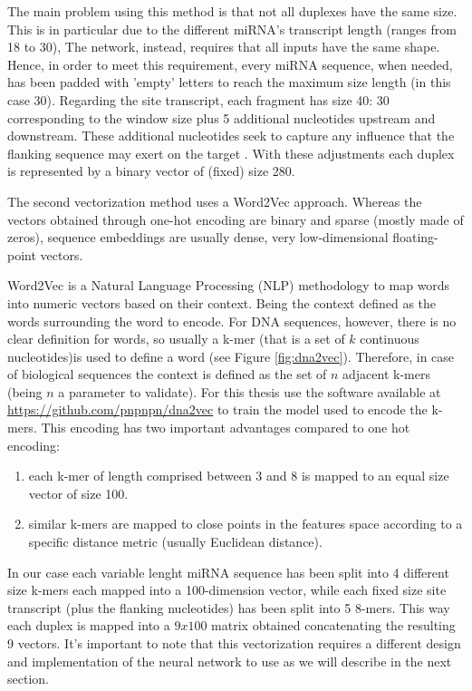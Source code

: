 The main problem using this method is that not all duplexes have the same size. This is in particular due to the different miRNA's transcript length (ranges from 18 to 30), The network, instead, requires that all inputs have the same shape. Hence, in order to meet this requirement, every miRNA sequence, when needed, has been padded with 'empty' letters to reach the maximum size length (in this case 30). Regarding the site transcript, each fragment has size 40: 30 corresponding to the window size plus 5 additional nucleotides upstream and downstream. These additional nucleotides seek to capture any influence that the flanking sequence may exert on the target \cite{conserved_pairing}. With these adjustments each duplex is represented by a binary vector of (fixed) size 280.

The second vectorization method uses a Word2Vec approach. Whereas the vectors obtained through one-hot encoding are binary and sparse (mostly made of zeros), sequence embeddings are usually dense, very low-dimensional floating-point vectors. 

Word2Vec \cite{word2vec} is a Natural Language Processing (NLP) methodology to map words into numeric vectors based on their context. Being the context defined as the words surrounding the word to encode. For DNA sequences, however, there is no clear definition for words, so usually a k-mer (that is a set of $k$ continuous nucleotides)is used to define a word (see Figure \ref{fig:dna2vec}). Therefore, in case of biological sequences the context is defined as the set of $n$ adjacent k-mers (being $n$ a parameter to validate). For this thesis use the software available at \url{https://github.com/pnpnpn/dna2vec} to train the model used to encode the k-mers. This encoding has two important advantages compared to one hot encoding:

\begin{enumerate}
	\item each k-mer of length comprised between 3 and 8 is mapped to an equal size vector of size 100.
	\item similar k-mers are mapped to close points in the features space according to a specific distance metric (usually Euclidean distance).
\end{enumerate}

In our case each variable lenght miRNA sequence has been split into 4 different size k-mers each mapped into a 100-dimension vector, while each fixed size site transcript (plus the flanking nucleotides) has been split into 5 8-mers. This way each duplex is mapped into a $9x100$ matrix obtained concatenating the resulting 9 vectors. It's important to note that this vectorization requires a different design and implementation of the neural network to use as we will describe in the next section.

